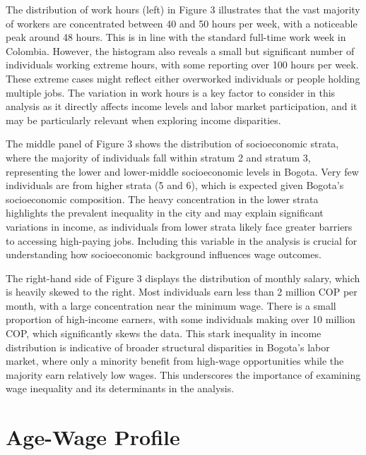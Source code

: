 \documentclass[11pt,a4paper,onecolumn]{article}
\begin{document}
    The distribution of work hours (left) in Figure 3 illustrates that the vast majority of workers are concentrated between 40 and 50 hours per week, with a noticeable peak around 48 hours. This is in line with the standard full-time work week in Colombia. However, the histogram also reveals a small but significant number of individuals working extreme hours, with some reporting over 100 hours per week. These extreme cases might reflect either overworked individuals or people holding multiple jobs. The variation in work hours is a key factor to consider in this analysis as it directly affects income levels and labor market participation, and it may be particularly relevant when exploring income disparities.
    
    The middle panel of Figure 3 shows the distribution of socioeconomic strata, where the majority of individuals fall within stratum 2 and stratum 3, representing the lower and lower-middle socioeconomic levels in Bogota. Very few individuals are from higher strata (5 and 6), which is expected given Bogota's socioeconomic composition. The heavy concentration in the lower strata highlights the prevalent inequality in the city and may explain significant variations in income, as individuals from lower strata likely face greater barriers to accessing high-paying jobs. Including this variable in the analysis is crucial for understanding how socioeconomic background influences wage outcomes.
    
    The right-hand side of Figure 3 displays the distribution of monthly salary, which is heavily skewed to the right. Most individuals earn less than 2 million COP per month, with a large concentration near the minimum wage. There is a small proportion of high-income earners, with some individuals making over 10 million COP, which significantly skews the data. This stark inequality in income distribution is indicative of broader structural disparities in Bogota's labor market, where only a minority benefit from high-wage opportunities while the majority earn relatively low wages. This underscores the importance of examining wage inequality and its determinants in the analysis.




\section{Age-Wage Profile}
\end{document}
